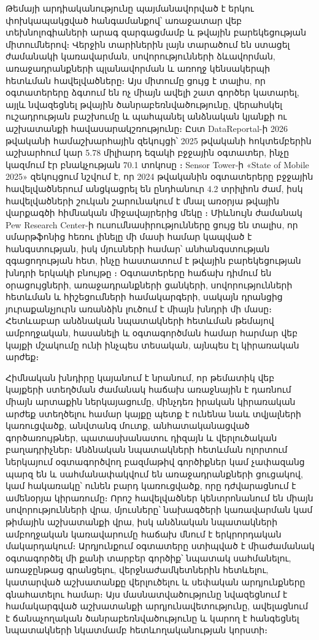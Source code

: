 Թեմայի արդիականությունը պայմանավորված է երկու փոխկապակցված հանգամանքով՝ առաջատար վեբ տեխնոլոգիաների արագ զարգացմամբ և թվային բարեկեցության միտումներով։ Վերջին տարիներին լայն տարածում են ստացել ժամանակի կառավարման, սովորությունների ձևավորման, առաջադրանքների պլանավորման և առողջ կենսակերպի հետևման հավելվածները։ Այս միտումը ցույց է տալիս, որ օգտատերերը ձգտում են ոչ միայն ավելի շատ գործեր կատարել, այլև նվազեցնել թվային ծանրաբեռնվածությունը, վերահսկել ուշադրության բաշխումը և պահպանել անձնական կյանքի ու աշխատանքի հավասարակշռությունը։ Ըստ DataReportal-ի 2026 թվականի համաշխարհային զեկույցի՝ 2025 թվականի հոկտեմբերին աշխարհում կար 5.78 միլիարդ եզակի բջջային օգտատեր, ինչը կազմում էր բնակչության 70.1 տոկոսը \autocite{datareportal2026}։ Sensor Tower-ի «State of Mobile 2025» զեկույցում նշվում է, որ 2024 թվականին օգտատերերը բջջային հավելվածներում անցկացրել են ընդհանուր 4.2 տրիլիոն ժամ, իսկ հավելվածների շուկան շարունակում է մնալ առօրյա թվային վարքագծի հիմնական միջավայրերից մեկը \autocite{sensortower2025}։ Միևնույն ժամանակ Pew Research Center-ի ուսումնասիրությունները ցույց են տալիս, որ սմարթֆոնից հեռու լինելը մի մասի համար կապված է հանգստության, իսկ մյուսների համար՝ անհանգստության զգացողության հետ, ինչը հաստատում է թվային բարեկեցության խնդրի երկակի բնույթը \autocite{pew2024screens}։ Օգտատերերը հաճախ դիմում են օրացույցների, առաջադրանքների ցանկերի, սովորությունների հետևման և հիշեցումների համակարգերի, սակայն դրանցից յուրաքանչյուրն առանձին լուծում է միայն խնդրի մի մասը։ Հետևաբար անձնական նպատակների հետևման թեմայով ամբողջական, հասանելի և օգտագործման համար հարմար վեբ կայքի մշակումը ունի ինչպես տեսական, այնպես էլ կիրառական արժեք։

Հիմնական խնդիրը կայանում է նրանում, որ թեմատիկ վեբ կայքերի ստեղծման ժամանակ հաճախ առաջնային է դառնում միայն արտաքին ներկայացումը, մինչդեռ իրական կիրառական արժեք ստեղծելու համար կայքը պետք է ունենա նաև տվյալների կառուցվածք, անվտանգ մուտք, անհատականացված գործառույթներ, պատասխանատու դիզայն և վերլուծական բաղադրիչներ։ Անձնական նպատակների հետևման ոլորտում ներկայում օգտագործվող բազմաթիվ գործիքներ կամ չափազանց պարզ են և սահմանափակվում են առաջադրանքների ցուցակով, կամ հակառակը՝ ունեն բարդ կառուցվածք, որը դժվարացնում է ամենօրյա կիրառումը։ Որոշ հավելվածներ կենտրոնանում են միայն սովորությունների վրա, մյուսները՝ նախագծերի կառավարման կամ թիմային աշխատանքի վրա, իսկ անձնական նպատակների ամբողջական կառավարումը հաճախ մնում է երկրորդական մակարդակում։ Արդյունքում օգտատերը ստիպված է միաժամանակ օգտագործել մի քանի տարբեր գործիք՝ նպատակ սահմանելու, առաջընթաց գրանցելու, վերջնաժամկետներին հետևելու, կատարված աշխատանքը վերլուծելու և սեփական արդյունքները գնահատելու համար։ Այս մասնատվածությունը նվազեցնում է համակարգված աշխատանքի արդյունավետությունը, ավելացնում է ճանաչողական ծանրաբեռնվածությունը և կարող է հանգեցնել նպատակների նկատմամբ հետևողականության կորստի։

